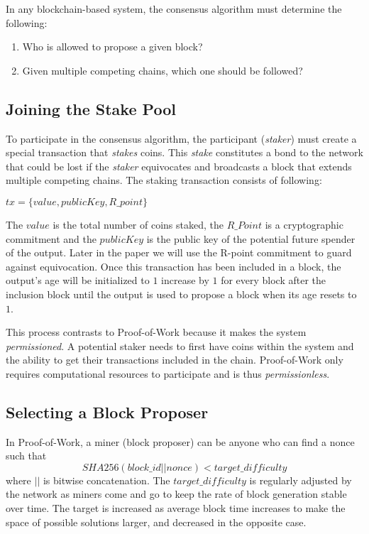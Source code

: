 \documentclass{article}
\begin{document}
In any blockchain-based system, the consensus algorithm must determine the following:
\begin{enumerate}
\item{Who is allowed to propose a given block?}
\item{Given multiple competing chains, which one should be followed?}
\end{enumerate}

\subsection{Joining the Stake Pool}

To participate in the consensus algorithm, the participant (\textit{staker}) must create a special transaction that \textit{stakes} coins. This \textit{stake} constitutes a bond to the network that could be lost if the \textit{staker} equivocates and broadcasts a block that extends multiple competing chains. The staking transaction consists of following:
\begin{center}
$tx = \{value, publicKey, R\_point\}$
\end{center}
The $value$ is the total number of coins staked, the $R\_Point$ is a cryptographic commitment and the $publicKey$ is the public key of the potential future spender of the output. Later in the paper we will use the R-point commitment to guard against equivocation. Once this transaction has been included in a block, the output's age will be initialized to $ 1 $ increase by $ 1 $ for every block after the inclusion block until the output is used to propose a block when its age resets to $ 1 $.

This process contrasts to Proof-of-Work because it makes the system \textit{permissioned}. A potential staker needs to first have coins within the system and the ability to get their transactions included in the chain. Proof-of-Work only requires computational resources to participate and is thus \textit{permissionless}.

\subsection{Selecting a Block Proposer}
In Proof-of-Work, a miner (block proposer) can be anyone who can find a nonce such that 
$$SHA256(block\_id || nonce) < target\_difficulty$$
where $||$ is bitwise concatenation. The $target\_difficulty$ is regularly adjusted by the network as miners come and go to keep the rate of block generation stable over time. The target is increased as average block time increases to make the space of possible solutions larger, and decreased in the opposite case.
\end{document}
